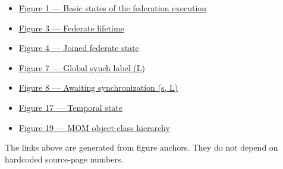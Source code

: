 \documentclass[10pt,oneside]{article}
\begin{document}
\clearpage
\thispagestyle{RLHLA}
\begin{itemize}[leftmargin=26pt,itemsep=5pt]
    \item \hyperlink{figure:1}{Figure 1 --- Basic states of the federation execution}
    \item \hyperlink{figure:3}{Figure 3 --- Federate lifetime}
    \item \hyperlink{figure:4}{Figure 4 --- Joined federate state}
    \item \hyperlink{figure:7}{Figure 7 --- Global synch label (L)}
    \item \hyperlink{figure:8}{Figure 8 --- Awaiting synchronization (s, L)}
    \item \hyperlink{figure:17}{Figure 17 --- Temporal state}
    \item \hyperlink{figure:19}{Figure 19 --- MOM object-class hierarchy}
\end{itemize}
\vspace{12pt}
The links above are generated from figure anchors. They do not depend on
hardcoded source-page numbers.
\end{document}
